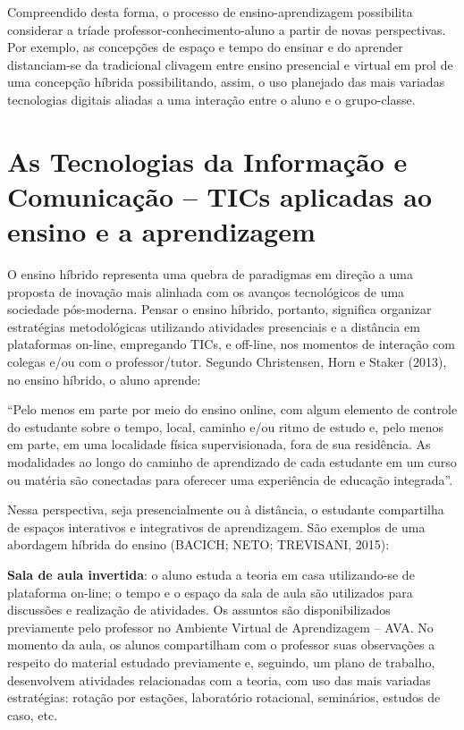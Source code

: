 \documentclass[
	12pt,				%
	openright,			%
  oneside,     %
	a4paper,			%
	chapter=TITLE,		%
	english,			%
	french,				%
	spanish,			%
	brazil				%
	]{abntex2}
\begin{document}
Compreendido desta forma, o processo de ensino-aprendizagem possibilita considerar a tríade professor-conhecimento-aluno a partir de novas perspectivas. Por exemplo, as concepções de espaço e tempo do ensinar e do aprender distanciam-se da tradicional clivagem entre ensino presencial e virtual em prol de uma concepção híbrida possibilitando, assim, o uso planejado das mais variadas tecnologias digitais aliadas a uma interação entre o aluno e o grupo-classe.

\section{As Tecnologias da Informação e Comunicação – TICs aplicadas ao ensino e a aprendizagem}

O ensino híbrido representa uma quebra de paradigmas em direção a uma proposta de inovação mais alinhada com os avanços tecnológicos de uma sociedade pós-moderna. Pensar o ensino híbrido, portanto, significa organizar estratégias metodológicas utilizando atividades presenciais e a distância em plataformas on-line, empregando TICs, e off-line, nos momentos de interação com colegas e/ou com o professor/tutor. Segundo Christensen, Horn e Staker (2013), no ensino híbrido, o aluno aprende:

\begin{citacao}
    “Pelo menos em parte por meio do ensino online, com algum elemento de controle do estudante sobre o tempo, local, caminho e/ou ritmo de estudo e, pelo menos em parte, em uma localidade física supervisionada, fora de sua residência. As modalidades ao longo do caminho de aprendizado de cada estudante em um curso ou matéria são conectadas para oferecer uma experiência de educação integrada”.
\end{citacao}

Nessa perspectiva, seja presencialmente ou à distância, o estudante compartilha de espaços interativos e integrativos de aprendizagem. São exemplos de uma abordagem híbrida do ensino (BACICH; NETO; TREVISANI, 2015):

\noindent \textbf{Sala de aula invertida}: o aluno estuda a teoria em casa utilizando-se de plataforma on-line; o tempo e o espaço da sala de aula são utilizados para discussões e realização de atividades. Os assuntos são disponibilizados previamente pelo professor no Ambiente Virtual de Aprendizagem – AVA. No momento da aula, os alunos compartilham com o professor suas observações a respeito do material estudado previamente e, seguindo, um plano de trabalho, desenvolvem atividades relacionadas com a teoria, com uso das mais variadas estratégias: rotação por estações, laboratório rotacional, seminários, estudos de caso, etc.
\end{document}
